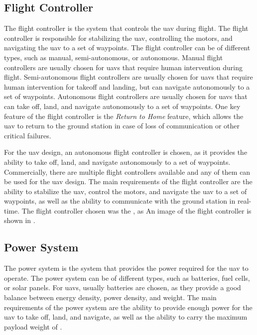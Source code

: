 
\subsection{Flight Controller}

The flight controller is the system that controls the \gls{uav} during flight. The flight controller is responsible for stabilizing the \gls{uav}, controlling the motors, and navigating the \gls{uav} to a set of waypoints. The flight controller can be of different types, such as manual, semi-autonomous, or autonomous. Manual flight controllers are usually chosen for \glspl{uav} that require human intervention during flight. Semi-autonomous flight controllers are usually chosen for \glspl{uav} that require human intervention for takeoff and landing, but can navigate autonomously to a set of waypoints. Autonomous flight controllers are usually chosen for \glspl{uav} that can take off, land, and navigate autonomously to a set of waypoints. One key feature of the flight controller is the \textit{Return to Home} feature, which allows the \gls{uav} to return to the ground station in case of loss of communication or other critical failures.

For the \gls{uav} design, an autonomous flight controller is chosen, as it provides the ability to take off, land, and navigate autonomously to a set of waypoints. Commercially, there are multiple flight controllers available  and any of them can be used for the \gls{uav} design. The main requirements of the flight controller are the ability to stabilize the \gls{uav}, control the motors, and navigate the \gls{uav} to a set of waypoints, as well as the ability to communicate with the ground station in real-time. The flight controller chosen was the , as  An image of the flight controller is shown in .



\subsection{Power System}\label{subsec:design_power_system}

The power system is the system that provides the power required for the \gls{uav} to operate. The power system can be of different types, such as batteries, fuel cells, or solar panels. For \glspl{uav}, usually batteries are chosen, as they provide a good balance between energy density, power density, and weight. The main requirements of the power system are the ability to provide enough power for the \gls{uav} to take off, land, and navigate, as well as the ability to carry the maximum payload weight of .

